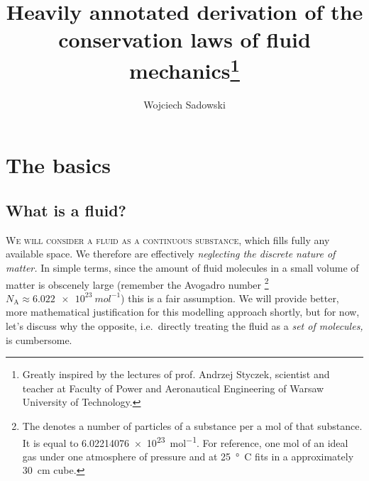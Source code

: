 \documentclass[justified, nobib]{tufte-handout}
\title{Heavily annotated derivation of the conservation laws of fluid 
  mechanics\thanks{%
    Greatly inspired by the lectures of prof. Andrzej Styczek, 
    scientist and teacher at Faculty of Power and Aeronautical Engineering of
    Warsaw University of Technology.}}
\author[Wojciech Sadowski]{Wojciech Sadowski}
\begin{document}
\maketitle%

\begin{abstract}
\noindent
  \lipsum[1]{}
\end{abstract}

\section{The basics}

\subsection{What is a fluid?}
\textsc{We will consider a fluid as a continuous substance,} which fills fully
any available space. We therefore are effectively \emph{neglecting the discrete
nature of matter.} In simple terms, since the amount of fluid molecules in a
small volume of matter is obscenely large (remember the Avogadro number%
\footnote{
  The  denotes a number of
  particles of a substance per a \si{mol} of that substance. It is equal to
  \SI{6.02214076e23}{mol^{-1}}. For reference, one \si{mol} of an ideal gas
  under one atmosphere of pressure and at \SI{25}{\degree C} fits in a
  approximately \SI{30}{cm} cube.
} 
\(N_\mathrm{A}\approx\SI{6.022e23}{mol^{-1}}\)) this is a fair assumption. We
will provide better, more mathematical justification for this modelling
approach shortly, but for now, let's discuss why the opposite, i.e.\ directly
treating the fluid as a \emph{set of molecules,} is cumbersome.
\end{document}
